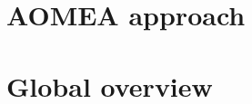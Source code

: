 \documentclass[runningheads]{llncs}
\begin{document}
%



\section{AOMEA approach}







\section{Global overview}
\end{document}
